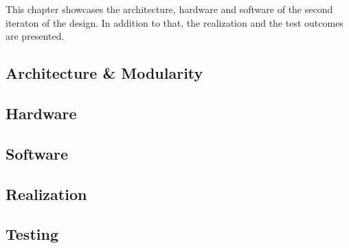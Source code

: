 \IEEEPARstart
{T}{his} chapter showcases the architecture, hardware and software
of the second iteraton of the design. In addition to that, the 
realization and the test outcomes are presented.  

\subsection{Architecture \& Modularity}


\subsection{Hardware}


\subsection{Software}


\subsection{Realization}


\subsection{Testing}
